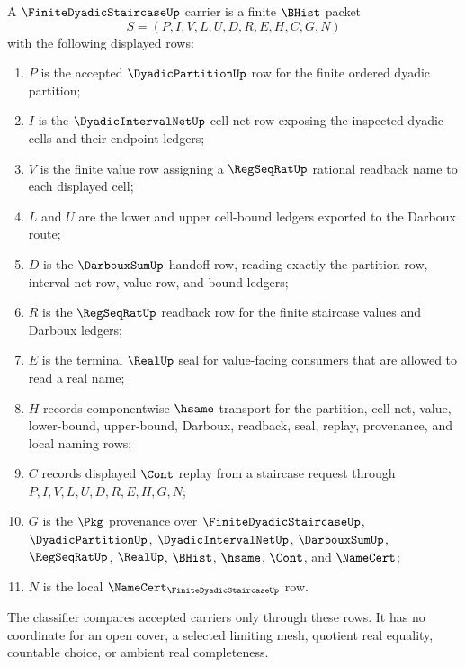 \begin{definition}
\label{def:finite-dyadic-staircase-carrier}
A $\FiniteDyadicStaircaseUp$ carrier is a finite $\BHist$ packet
$$
S=(P,I,V,L,U,D,R,E,H,C,G,N)
$$
with the following displayed rows:
\begin{enumerate}
\item $P$ is the accepted $\DyadicPartitionUp$ row for the finite ordered dyadic partition;
\item $I$ is the $\DyadicIntervalNetUp$ cell-net row exposing the inspected dyadic cells and their endpoint ledgers;
\item $V$ is the finite value row assigning a $\RegSeqRatUp$ rational readback name to each displayed cell;
\item $L$ and $U$ are the lower and upper cell-bound ledgers exported to the Darboux route;
\item $D$ is the $\DarbouxSumUp$ handoff row, reading exactly the partition row, interval-net row, value row, and bound ledgers;
\item $R$ is the $\RegSeqRatUp$ readback row for the finite staircase values and Darboux ledgers;
\item $E$ is the terminal $\RealUp$ seal for value-facing consumers that are allowed to read a real name;
\item $H$ records componentwise $\hsame$ transport for the partition, cell-net, value, lower-bound, upper-bound, Darboux, readback, seal, replay, provenance, and local naming rows;
\item $C$ records displayed $\Cont$ replay from a staircase request through $P,I,V,L,U,D,R,E,H,G,N$;
\item $G$ is the $\Pkg$ provenance over $\FiniteDyadicStaircaseUp$, $\DyadicPartitionUp$, $\DyadicIntervalNetUp$, $\DarbouxSumUp$, $\RegSeqRatUp$, $\RealUp$, $\BHist$, $\hsame$, $\Cont$, and $\NameCert$;
\item $N$ is the local $\NameCert_{\FiniteDyadicStaircaseUp}$ row.
\end{enumerate}
The classifier compares accepted carriers only through these rows. It has no coordinate for an open cover, a selected limiting mesh, quotient real equality, countable choice, or ambient real completeness.
\end{definition}

